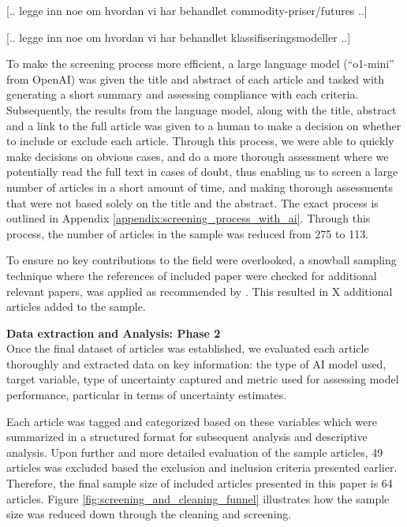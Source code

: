[.. legge inn noe om hvordan vi har behandlet commodity-priser/futures ..]

[.. legge inn noe om hvordan vi har behandlet klassifiseringsmodeller ..]

To make the screening process more efficient, a large language model (``o1-mini'' from OpenAI) was given the title and abstract of each article and tasked with generating a short summary and assessing compliance with each criteria. Subsequently, the results from the language model, along with the title, abstract and a link to the full article was given to a human to make a decision on whether to include or exclude each article. Through this process, we were able to quickly make decisions on obvious cases, and do a more thorough assessment where we potentially read the full text in cases of doubt, thus enabling us to screen a large number of articles in a short amount of time, and making thorough assessments that were not based solely on the title and the abstract. The exact process is outlined in Appendix \ref{appendix:screening_process_with_ai}. Through this process, the number of articles in the sample was reduced from 275 to 113.

To ensure no key contributions to the field were overlooked, a snowball sampling technique where the references of included paper were checked for additional relevant papers, was applied as recommended by \textcite{marzi_et_al_2024}. This resulted in X additional articles added to the sample. 


\textbf{Data extraction and Analysis: Phase 2 } \\
Once the final dataset of articles was established, we evaluated each article thoroughly and extracted data on key information: the type of AI model used, target variable, type of uncertainty captured and metric used for assessing model performance, particular in terms of uncertainty estimates. 

Each article was tagged and categorized based on these variables which were summarized in a structured format for subsequent analysis and descriptive analysis. Upon further and more detailed evaluation of the sample articles, 49 articles was excluded based the exclusion and inclusion criteria presented earlier. 
Therefore, the final sample size of included articles presented in this paper is 64 articles. Figure \ref{fig:screening_and_cleaning_funnel} illustrates how the sample size was reduced down through the cleaning and screening. 

